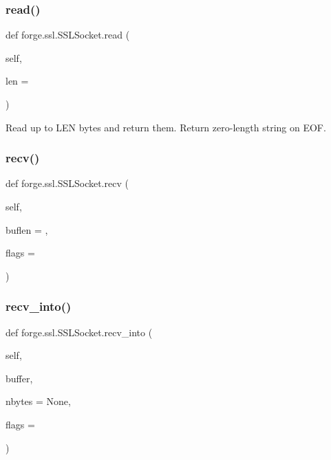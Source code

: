 \subsubsection{\texorpdfstring{read()}{read()}}
{\footnotesize\ttfamily def forge.\+ssl.\+S\+S\+L\+Socket.\+read (\begin{DoxyParamCaption}\item[{}]{self,  }\item[{}]{len = {} }\end{DoxyParamCaption})}

\begin{DoxyVerb}Read up to LEN bytes and return them.
Return zero-length string on EOF.\end{DoxyVerb}
 \mbox{\label{classforge_1_1ssl_1_1_s_s_l_socket_a94636100b76ef75be8f44a82bce063f1}} 
\subsubsection{\texorpdfstring{recv()}{recv()}}
{\footnotesize\ttfamily def forge.\+ssl.\+S\+S\+L\+Socket.\+recv (\begin{DoxyParamCaption}\item[{}]{self,  }\item[{}]{buflen = {},  }\item[{}]{flags = {} }\end{DoxyParamCaption})}

\mbox{\label{classforge_1_1ssl_1_1_s_s_l_socket_a0d58a08ffcecf65e60beb9c40a9a03b2}} 
\subsubsection{\texorpdfstring{recv\+\_\+into()}{recv\_into()}}
{\footnotesize\ttfamily def forge.\+ssl.\+S\+S\+L\+Socket.\+recv\+\_\+into (\begin{DoxyParamCaption}\item[{}]{self,  }\item[{}]{buffer,  }\item[{}]{nbytes = {\ttfamily None},  }\item[{}]{flags = {} }\end{DoxyParamCaption})}

